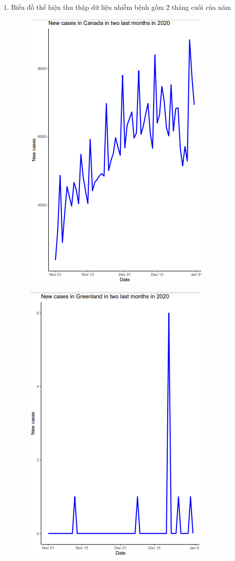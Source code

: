\documentclass[a4paper]{article}
\theoremstyle{definition}
\begin{document}
\begin{enumerate}[i)]
\begin{enumerate}[1]
\begin{figure}[H]
			\end{figure}
			\item Biểu đồ thể hiện thu thập dữ liệu nhiễm bệnh gồm 2 tháng cuối của năm
			\begin{figure}[H]
				\centering
				\includegraphics[scale=0.8]{images/5.4.1.png}
			\end{figure}
			\begin{figure}[H]
				\centering
				\includegraphics[scale=0.8]{images/5.4.2.png}

\end{figure}
\end{enumerate}
\end{enumerate}
\end{document}
